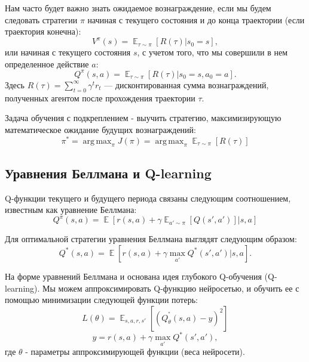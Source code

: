 \documentclass[12pt, a4paper]{extarticle}
\newcommand{\E}{\mathop{\mathbb{E}}}
\DeclareMathOperator*{\argmax}{arg\,max}
\theoremstyle{definition}
\begin{document}
Нам часто будет важно знать ожидаемое вознаграждение, если мы будем следовать стратегии $\pi$ начиная с текущего состояния и до конца траектории (если траектория конечна):
\begin{equation}
    V^{\pi}(s)=\E_{\tau \sim \pi} \left[R(\tau) | s_0 = s \right],
\end{equation}
или начиная с текущего состояния $s$, с учетом того, что мы совершили в нем определенное действие $a$:
\begin{equation}
    Q^{\pi}(s,a)=\E_{\tau \sim \pi} \left[R(\tau) | s_0 = s, a_0 = a \right].
\end{equation}
Здесь $R(\tau) = \sum^{\infty}_{t=0}\gamma^t r_t$ --- дисконтированная сумма вознаграждений, полученных агентом после прохождения траектории $\tau$. 

Задача обучения с подкреплением - выучить стратегию, максимизирующую математическое ожидание будущих вознаграждений:
\begin{equation}
    \pi^{*}=\argmax_{\pi}J(\pi)=\argmax_{\pi} \E_{\tau \sim \pi}\left[R(\tau)\right]
\end{equation}

\subsection{Уравнения Беллмана и Q-learning}
Q-функции текущего и будущего периода связаны следующим соотношением, известным как уравнение Беллмана:
\begin{equation} 
    Q^{\pi}(s,a) = \E\left[r(s,a) + \gamma  \E_{a' \sim \pi} \left[ Q(s',a') \right]|s, a \right]
\end{equation}

Для оптимальной стратегии уравнения Беллмана выглядят следующим образом:
\begin{equation} \label{opt_bell}
    Q^{*}(s,a) = \E \left[r(s,a) + \gamma  \max_{a'}  Q^{*}(s',a') | s, a \right].
\end{equation}

На форме уравнений Беллмана и основана идея глубокого Q-обучения (Q-learning). Мы можем аппроксимировать Q-функцию нейросетью, и обучить ее с помощью минимизации следующей функции потерь:
\begin{equation} \label{q-loss}
    L(\theta) = \E_{s,a,r,s'} \left[ (Q_{\theta}^{^*}(s,a) - y)^2  \right]
    \end{equation}
\begin{equation}
    y = r(s,a) + \gamma  \max_{a'}  Q^{*}(s',a'),
\end{equation}
где $\theta$ - параметры аппроксимирующей функции (веса нейросети).
\end{document}
